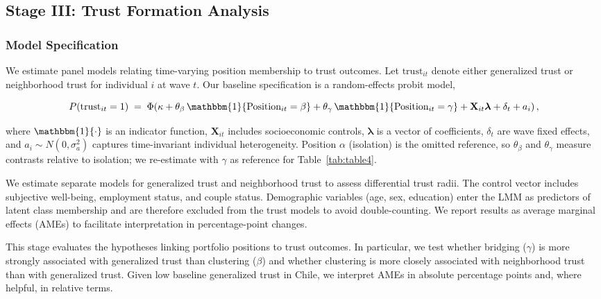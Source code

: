 \subsection{Stage III: Trust Formation Analysis}

\subsubsection{Model Specification}

We estimate panel models relating time-varying position membership to trust outcomes. Let $\text{trust}_{it}$ denote either generalized trust or neighborhood trust for individual $i$ at wave $t$. Our baseline specification is a random-effects probit model,

\begin{equation}
P(\text{trust}_{it}=1) \;=\; \Phi\!\left(\kappa
+ \theta_{\beta}\,\mathbbm{1}\{\text{Position}_{it}=\beta\}
+ \theta_{\gamma}\,\mathbbm{1}\{\text{Position}_{it}=\gamma\}
+ \mathbf{X}_{it}\boldsymbol{\lambda}
+ \delta_t + a_i\right),
\end{equation}

where $\mathbbm{1}\{\cdot\}$ is an indicator function, $\mathbf{X}_{it}$ includes socioeconomic controls, $\boldsymbol{\lambda}$ is a vector of coefficients, $\delta_t$ are wave fixed effects, and $a_i\sim N(0,\sigma_a^2)$ captures time-invariant individual heterogeneity. Position $\alpha$ (isolation) is the omitted reference, so $\theta_\beta$ and $\theta_\gamma$ measure contrasts relative to isolation; we re-estimate with $\gamma$ as reference for Table~\ref{tab:table4}.

We estimate separate models for generalized trust and neighborhood trust to assess differential trust radii. The control vector includes subjective well-being, employment status, and couple status. Demographic variables (age, sex, education) enter the LMM as predictors of latent class membership and are therefore excluded from the trust models to avoid double-counting. We report results as average marginal effects (AMEs) to facilitate interpretation in percentage-point changes.

This stage evaluates the hypotheses linking portfolio positions to trust outcomes. In particular, we test whether bridging ($\gamma$) is more strongly associated with generalized trust than clustering ($\beta$) and whether clustering is more closely associated with neighborhood trust than with generalized trust. Given low baseline generalized trust in Chile, we interpret AMEs in absolute percentage points and, where helpful, in relative terms.

